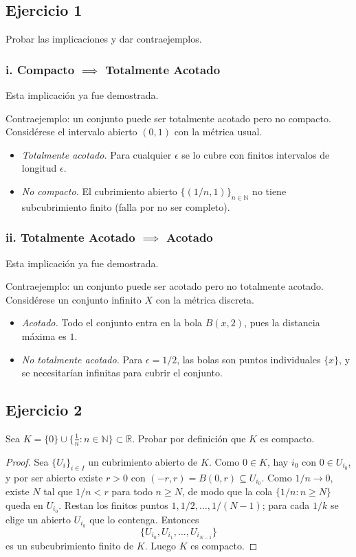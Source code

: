 \documentclass[11pt, a4paper]{article}
\begin{document}
\subsection*{Ejercicio 1}

Probar las implicaciones y dar contraejemplos.

\subsubsection*{i. Compacto $\implies$ Totalmente Acotado}
Esta implicación ya fue demostrada.

Contraejemplo: un conjunto puede ser totalmente acotado pero no compacto. Considérese el intervalo
abierto $(0, 1)$ con la métrica usual.
\begin{itemize}
    \item \textit{Totalmente acotado.} Para cualquier $\epsilon$ se lo cubre con finitos intervalos
    de longitud $\epsilon$.
    \item \textit{No compacto.} El cubrimiento abierto $\{(1/n, 1)\}_{n \in \mathbb{N}}$ no tiene
    subcubrimiento finito (falla por no ser completo).
\end{itemize}

\subsubsection*{ii. Totalmente Acotado $\implies$ Acotado}
Esta implicación ya fue demostrada.

Contraejemplo: un conjunto puede ser acotado pero no totalmente acotado. Considérese un conjunto
infinito $X$ con la métrica discreta.
\begin{itemize}
    \item \textit{Acotado.} Todo el conjunto entra en la bola $B(x, 2)$, pues la distancia máxima es
    $1$.
    \item \textit{No totalmente acotado.} Para $\epsilon = 1/2$, las bolas son puntos individuales
    $\{x\}$, y se necesitarían infinitas para cubrir el conjunto.
\end{itemize}

\subsection*{Ejercicio 2}

Sea $K = \{0\} \cup \{ \frac{1}{n} : n \in \mathbb{N} \} \subset \mathbb{R}$. Probar por definición
que $K$ es compacto.

\begin{proof}
Sea $\{U_i\}_{i \in I}$ un cubrimiento abierto de $K$. Como $0 \in K$, hay $i_0$ con $0 \in U_{i_0}$,
y por ser abierto existe $r > 0$ con $(-r, r) = B(0, r) \subseteq U_{i_0}$. Como $1/n \to 0$, existe
$N$ tal que $1/n < r$ para todo $n \ge N$, de modo que la cola $\{1/n : n \ge N\}$ queda en $U_{i_0}$.
Restan los finitos puntos $1, 1/2, \dots, 1/(N-1)$; para cada $1/k$ se elige un abierto $U_{i_k}$ que
lo contenga. Entonces
$$ \{ U_{i_0}, U_{i_1}, \dots, U_{i_{N-1}} \} $$
es un subcubrimiento finito de $K$. Luego $K$ es compacto.
\end{proof}
\end{document}

